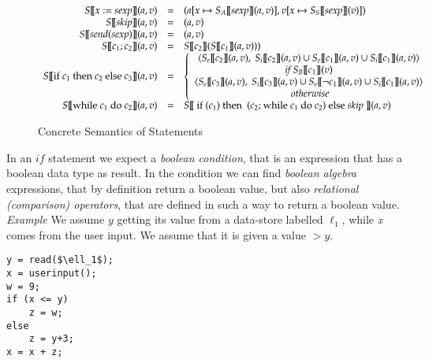 \documentclass{llncs}
\begin{document}
\begin{figure}[tbh]
\footnotesize \[
\begin{array}{rcl}
S [\![x := sexp ]\!](a, v) & = & (a[x \mapsto S_A [\![sexp ]\!](a, v)], v[x \mapsto S_S [\![sexp ]\!](v)]) \\
S [\![skip]\!](a, v) & = & (a, v) \\
S [\![send(sexp)]\!](a, v) & = & (a, v) \\
S [\![c_1 ; c_2 ]\!](a, v) & = &  S [\![c_2 ]\!](S [\![c_1 ]\!](a, v) )) \\
S [\![\mbox{if } c_1 \mbox{ then } c_2  \mbox{ else }c_3 ]\!](a, v) & = &  
\left\{
\begin{array}{c}
\langle S_e [\![c_2 ]\!](a, v),\ S_i [\![c_2 ]\!](a, v) \cup S_e [\![c_1 ]\!](a, v) \cup S_i [\![c_1 ]\!](a, v) \rangle\\
\textit{if } S_B [\![c_1]\!](v) \\
\langle S_e [\![c_3 ]\!](a, v),\ S_i [\![c_3 ]\!](a, v) \cup S_e [\![\neg c_1 ]\!](a, v) \cup S_i [\![c_1 ]\!](a, v) \rangle\\
\textit{ otherwise} \\
\end{array} \right. \\
S [\![\mbox{while } c_1 \mbox{ do } c_2]\!](a, v) & = &  S [\![\mbox{ if } (c_1) \mbox{ then } \mbox{ (}c_2\mbox{; while } c_1 \mbox{ do } c_2 ) \mbox{ else \textit{skip} }]\!](a, v)
\end{array}
\]
\caption{Concrete Semantics of Statements}
\label{sem_stm}
\end{figure}

\noindent In an $if$ statement we expect a \emph{boolean condition}, that is an expression that has a boolean data type as result. In the condition we can find \emph{boolean algebra} expressions, that by definition return a boolean value, but also \emph{relational (comparison) operators}, that are defined in such a way to return a boolean value.
\\

\noindent\textit{Example} We assume $y$ getting its value from a data-store labelled $\ell_1$, while \emph{x} comes from the user input. We assume that it is given a value $>y$.
\begin{lstlisting}
y = read($\ell_1$);
x = userinput();
w = 9;
if (x <= y)
    z = w;
else
    z = y+3;
x = x + z;
\end{lstlisting}
\end{document}
